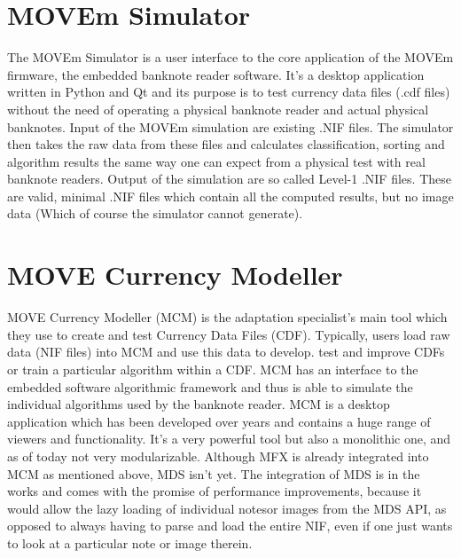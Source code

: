 \section{MOVEm Simulator}
The MOVEm Simulator is a user interface to the core application of the MOVEm firmware, the embedded banknote reader software. It's a desktop application written in Python and Qt and its purpose is to test currency data files (.cdf files) without the need of operating a physical banknote reader and actual physical banknotes. Input of the MOVEm simulation are existing .NIF files. The simulator then takes the raw data from these files and calculates classification, sorting and algorithm results the same way one can expect from a physical test with real banknote readers. Output of the simulation are so called Level-1 .NIF files. These are valid, minimal .NIF files which contain all the computed results, but no image data (Which of course the simulator cannot generate). 

\section{MOVE Currency Modeller}
MOVE Currency Modeller (MCM) is the adaptation specialist's main tool which they use to create and test Currency Data Files (CDF). Typically, users load raw data (NIF files) into MCM and use this data to develop. test and improve CDFs or train a particular algorithm within a CDF. MCM has an interface to the embedded software algorithmic framework and thus is able to simulate the individual algorithms used by the banknote reader. MCM is a desktop application which has been developed over years and contains a huge range of viewers and functionality. It's a very powerful tool but also a monolithic one, and as of today not very modularizable. Although MFX is already integrated into MCM as mentioned above, MDS isn't yet. The integration of MDS is in the works and comes with the promise of performance improvements, because it would allow the lazy loading of individual notesor images from the MDS API, as opposed to always having to parse and load the entire NIF, even if one just wants to look at a particular note or image therein.

